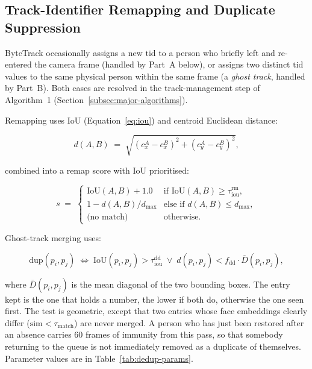 \subsection{Track-Identifier Remapping and Duplicate Suppression}
\label{subsec:remap}
\label{subsec:dedup}

ByteTrack occasionally assigns a new $\mathrm{tid}$ to a person who
briefly left and re-entered the camera frame (handled by Part~A
below), or assigns two distinct $\mathrm{tid}$ values to the same
physical person within the same frame (a \emph{ghost track}, handled
by Part~B). Both cases are resolved in the track-management step of
Algorithm~1 (Section~\ref{subsec:major-algorithms}).

Remapping uses IoU (Equation~\ref{eq:iou}) and centroid Euclidean
distance:

\begin{equation}
d(A, B) \;=\; \sqrt{(c_x^A - c_x^B)^2 + (c_y^A - c_y^B)^2},
\label{eq:cdist}
\end{equation}

\noindent combined into a remap score with IoU prioritised:

\begin{equation}
s \;=\;
\begin{cases}
\mathrm{IoU}(A, B) + 1.0 & \text{if } \mathrm{IoU}(A, B) \geq \tau_{\mathrm{iou}}^{\mathrm{rm}}, \\[2pt]
1 - d(A, B)/d_{\max}     & \text{else if } d(A, B) \leq d_{\max}, \\[2pt]
\text{(no match)}        & \text{otherwise.}
\end{cases}
\label{eq:remap}
\end{equation}

Ghost-track merging uses:

\begin{equation}
\mathrm{dup}(p_i, p_j) \;\Longleftrightarrow\;
\mathrm{IoU}(p_i, p_j) > \tau_{\mathrm{iou}}^{\mathrm{dd}}
\;\vee\;
d(p_i, p_j) < f_{\mathrm{dd}} \cdot \overline{D}(p_i, p_j),
\label{eq:dedup}
\end{equation}

\noindent where $\overline{D}(p_i, p_j)$ is the mean diagonal of the
two bounding boxes. The entry kept is the one that holds a number, the
lower if both do, otherwise the one seen first. The test is geometric,
except that two entries whose face embeddings clearly differ
($\mathrm{sim} < \tau_{\mathrm{match}}$) are never merged. A person who has just been restored after an
absence carries 60 frames of immunity from this pass, so that somebody
returning to the queue is not immediately removed as a duplicate of
themselves. Parameter values are in Table~\ref{tab:dedup-params}.

